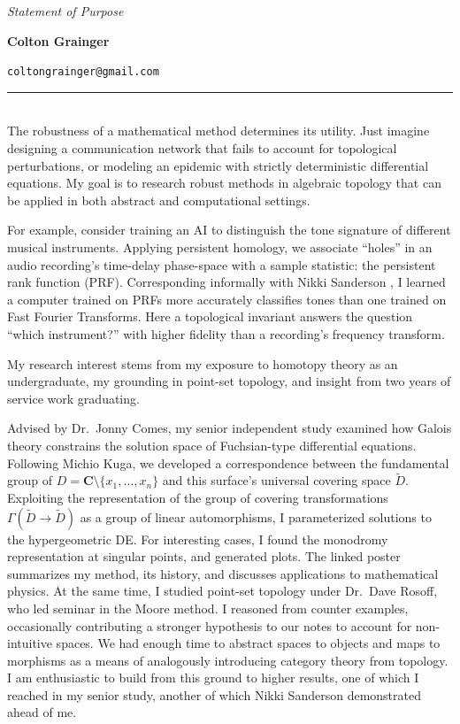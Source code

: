\documentclass{article}
\makeatletter
\newcommand\textbox[1]{\parbox{.33\textwidth}{#1}}
\newcommand\printheader{
  \noindent 
  \textbox{\emph{Statement of Purpose}} 
  \textbox{\centerline{\large\bf Colton Grainger}} 
  \textbox{\raggedleft \texttt{coltongrainger@gmail.com}\ 
}

\vspace{-14pt} 
\noindent 
\rule{\textwidth}{1pt}\\ }
\makeatother
\begin{document}
 

\printheader

The robustness of a mathematical method determines its utility. Just imagine designing a communication network that fails to account for topological perturbations, or modeling an epidemic with strictly deterministic differential equations. My goal is to research robust methods in algebraic topology that can be applied in both abstract and computational settings.

For example, consider training an AI to distinguish the tone signature of different musical instruments. Applying persistent homology, we associate ``holes'' in an audio recording's time-delay phase-space with a sample statistic: the persistent rank function (PRF). Corresponding informally with Nikki Sanderson \cite{Sanderson17}, I learned a computer trained on PRFs more accurately classifies tones than one trained on Fast Fourier Transforms. Here a topological invariant answers the question ``which instrument?'' with higher fidelity than a recording's frequency transform.

My research interest stems from my exposure to homotopy theory as an undergraduate, my grounding in point-set topology, and insight from two years of service work graduating.

Advised by Dr.~Jonny Comes, my senior independent study examined how Galois theory constrains the solution space of Fuchsian-type differential equations. Following Michio Kuga, we developed a correspondence between the fundamental group of \(D = \mathbf{C}\setminus\{x_1,\ldots,x_n\}\) and this surface's universal covering space \(\tilde{D}\). Exploiting the representation of the group of covering transformations \(\Gamma(\tilde{D} \to \tilde{D})\) as a group of linear automorphisms, I parameterized solutions to the hypergeometric DE. For interesting cases, I found the monodromy representation at singular points, and generated plots. The linked poster \cite{Grainger16} summarizes my method, its history, and discusses applications to mathematical physics. At the same time, I studied point-set topology under Dr.~Dave Rosoff, who led seminar in the Moore method. I reasoned from counter examples, occasionally contributing a stronger hypothesis to our notes to account for non-intuitive spaces. We had enough time to abstract spaces to objects and maps to morphisms as a means of analogously introducing category theory from topology. I am enthusiastic to build from this ground to higher results, one of which I reached in my senior study, another of which Nikki Sanderson demonstrated ahead of me.
\end{document}
